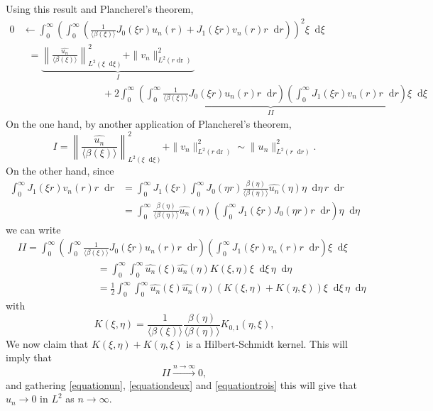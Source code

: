 \documentclass[11 pt]{amsart}
\newcommand{\tmop}[1]{\ensuremath{\operatorname{#1}}}
\theoremstyle{definition}
\theoremstyle{remark}
\numberwithin{equation}{section}
\newcommand{\dd}{\mathop{}\!\mathrm{d}}
\begin{document}
Using this result and Plancherel's theorem,
\begin{equation}
\label{equationun}
\begin{split}
 0 & \longleftarrow  \int_0^\infty \left( \int_0^\infty \left(
    \frac{1}{\langle \beta (\xi) \rangle} J_0 (\xi r) u_n (r) + J_1 (\xi r)
    v_n (r) r \dd r \right) \right)^2 \xi \dd \xi\\
& \; \; = \underbrace{\left\| \frac{\widehat{u_n}}{\langle \beta (\xi) \rangle} \right\|_{L^2(\xi \dd \xi)}^2 + \| v_n \|_{L^2 (r \tmop{dr})}^2}_{\displaystyle I} \\
& \qquad \qquad \qquad \qquad +\underbrace{ 2 \int_0^\infty \left( \int_0^\infty \frac{1}{\langle \beta
    (\xi) \rangle} J_0 (\xi r) u_n (r) r \dd r \right) \left( \int_0^\infty
    J_1 (\xi r) v_n (r) r \dd r \right) \xi \dd \xi}_{\displaystyle II}
  \end{split}
\end{equation}
On the one hand, by another application of Plancherel's theorem,
\begin{equation}
\label{equationdeux}
I = \left\| \frac{\widehat{u_n}}{\langle \beta (\xi) \rangle} \right\|_{L^2(\xi \dd \xi)}^2 + \| v_n \|_{L^2 (r \tmop{dr})}^2 \sim \| u_n \|_{L^2(r \dd r)}^2.
\end{equation}
On the other hand, since
  \begin{align*}
\int_0^\infty J_1 (\xi r) v_n (r) r \dd r & = \int_0^\infty J_1 (\xi r) \int_0^\infty J_0 (\eta r) \frac{\beta (\eta)}{\langle \beta (\eta) \rangle} \widehat{u_n} (\eta) \eta \dd \eta \, r \dd r\\
& =  \int_0^\infty \frac{\beta (\eta)}{\langle \beta (\eta) \rangle}
\widehat{u_n} (\eta) \left( \int_0^\infty J_1 (\xi r) J_0 (\eta r) r \dd r \right) \eta \dd \eta
\end{align*}
we can write
\begin{align*}
& II = \int_0^\infty \left( \int_0^\infty \frac{1}{\langle \beta (\xi) \rangle} J_0 (\xi r) u_n (r) r \dd r \right) \left( \int_0^\infty J_1 (\xi r) v_n (r) r \dd r \right) \xi \dd \xi\\
& \qquad \qquad\qquad \qquad =  \int_0^\infty \int_0^\infty \widehat{u_n} (\xi) \widehat{u_n}(\eta) K (\xi, \eta) \xi \dd \xi \, \eta \dd \eta\\
& \qquad \qquad\qquad \qquad =  \frac{1}{2} \int_0^\infty \int_0^\infty \widehat{u_n} (\xi) \widehat{u_n} (\eta) (K (\xi, \eta) + K (\eta, \xi)) \xi \dd \xi \, \eta \dd \eta
  \end{align*}
  with
  \[ K (\xi, \eta) = \frac{1}{\langle \beta (\xi) \rangle} \frac{\beta
     (\eta)}{\langle \beta (\eta) \rangle} K_{0, 1} (\eta, \xi), \]
We now claim that $K(\xi,\eta) + K(\eta,\xi)$ is a Hilbert-Schmidt kernel. This will imply that
\begin{equation}
\label{equationtrois}
II \overset{n \to \infty}{\longrightarrow} 0,
\end{equation}
and gathering \eqref{equationun}, \eqref{equationdeux} and \eqref{equationtrois} this will give that $u_n\to 0$ in $L^2$ as $n\to \infty$.
\end{document}

